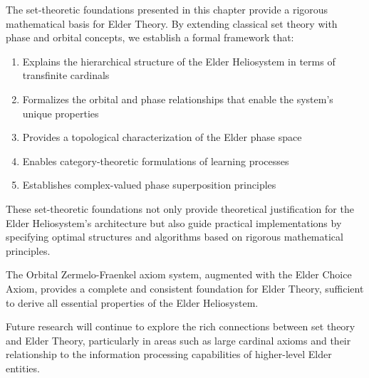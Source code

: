 The set-theoretic foundations presented in this chapter provide a rigorous mathematical basis for Elder Theory. By extending classical set theory with phase and orbital concepts, we establish a formal framework that:

\begin{enumerate}
    \item Explains the hierarchical structure of the Elder Heliosystem in terms of transfinite cardinals
    \item Formalizes the orbital and phase relationships that enable the system's unique properties
    \item Provides a topological characterization of the Elder phase space
    \item Enables category-theoretic formulations of learning processes
    \item Establishes complex-valued phase superposition principles
\end{enumerate}

These set-theoretic foundations not only provide theoretical justification for the Elder Heliosystem's architecture but also guide practical implementations by specifying optimal structures and algorithms based on rigorous mathematical principles.

\begin{theorem}
The Orbital Zermelo-Fraenkel axiom system, augmented with the Elder Choice Axiom, provides a complete and consistent foundation for Elder Theory, sufficient to derive all essential properties of the Elder Heliosystem.
\end{theorem}

Future research will continue to explore the rich connections between set theory and Elder Theory, particularly in areas such as large cardinal axioms and their relationship to the information processing capabilities of higher-level Elder entities.